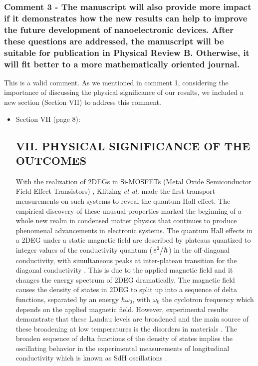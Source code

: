 \documentclass{article}
\begin{document}
\subsubsection*{Comment 3 -
\color{RoyalBlue} The manuscript will also provide more impact if it demonstrates how the new results can help to improve the future development of nanoelectronic devices. After these questions are addressed, the manuscript will be suitable for publication in Physical Review B. Otherwise, it will fit better to a more mathematically oriented journal.
}

This is a valid comment. As we mentioned in comment 1, considering the importance of discussing the physical significance of our results, we included a new section (Section VII) to address this comment.

\begin{itemize}
  \item Section VII (page 8):\\
  {\color{Red}
  \subsection*{VII. PHYSICAL SIGNIFICANCE OF THE OUTCOMES}

  With the realization of 2DEGs in Si-MOSFETs (Metal Oxide Semiconductor Field Effect Transistors) \citep{fowler66}, Klitzing \textit{et al.} \cite{klitzing80} made the first transport measurements on such systems to reveal the quantum Hall effect. The empirical discovery of these unusual properties marked the beginning of a whole new realm in condensed matter physics that continues to produce phenomenal advancements in electronic systems. The quantum Hall effects in a 2DEG under a static magnetic field are described by plateaus quantized to integer values of the conductivity quantum ($\flatfrac{e^2}{\hbar}$) in the off-diagonal conductivity, with simultaneous peaks at inter-plateau transition for the diagonal conductivity \cite{endo09}. This is due to the applied magnetic field and it changes the energy spectrum of 2DEG dramatically. The magnetic field causes the density of states in 2DEG to split up into a sequence of delta functions, separated by an energy $\hbar\omega_0$, with $\omega_0$ the cyclotron frequency which depends on the applied magnetic field.
  However, experimental results demonstrate that these Landau levels are broadened and the main source of these broadening at low temperatures is the disorders in materials \cite{ando85,dial07}. The broaden sequence of delta functions of the density of states implies the oscillating behavior in the experimental measurements of longitudinal conductivity which is known as SdH oscillations \cite{endo09,wakabayashi78}.

}
\end{itemize}
\end{document}

